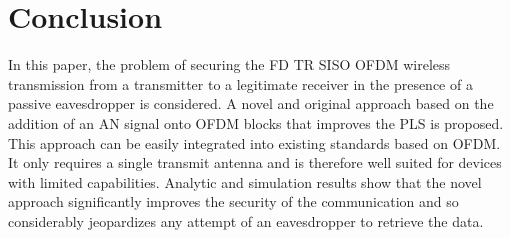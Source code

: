 \documentclass[conference]{IEEEtran}
\begin{document}

\section{Conclusion}
In this paper, the problem of securing the FD TR SISO OFDM wireless transmission from a transmitter to a legitimate receiver in the presence of a passive eavesdropper is considered. A novel and original approach based on the addition of an AN signal onto OFDM blocks that improves the PLS is proposed. This approach can be easily integrated into existing standards based on OFDM. It only requires a single transmit antenna and is therefore well suited for devices with limited capabilities. Analytic and simulation results show that the novel approach significantly improves the security of the communication and so considerably jeopardizes any attempt of an eavesdropper to retrieve the data.
\label{sec:ccl}



\end{document}
